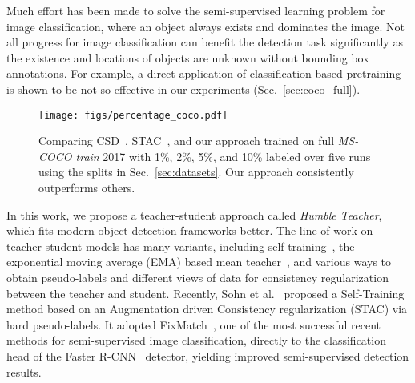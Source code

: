 \documentclass[final]{cvpr}
\begin{document}
Much effort has been made to solve the semi-supervised learning problem for image classification, where an object always exists and dominates the image. 
Not all progress for image classification can benefit the detection task significantly as the existence and locations of objects are unknown without bounding box annotations. 
For example, a direct application of classification-based pretraining~\cite{He_2020_moco,chen2020improved} is shown to be not so effective in our experiments (Sec.~\ref{sec:coco_full}).

\begin{figure}[tp!]
  \centering
  \vspace*{0.2em}
  \texttt{[image: figs/percentage\_coco.pdf]}
  \caption{Comparing CSD~\cite{jeong2019consistency}, STAC~\cite{sohn2020simple}, and our approach trained on full \textit{MS-COCO train} 2017 with 1\%, 2\%, 5\%, and 10\% labeled over five runs using the splits in Sec.~\ref{sec:datasets}. Our approach consistently outperforms others.}\label{fig:percentage_COCO}
\end{figure}

In this work, we propose a teacher-student approach called \emph{Humble
Teacher}, which fits modern object detection frameworks better.
The line of work on teacher-student models has many variants, including
self-training~\cite{scudder1965probability,yarowsky1995unsupervised,riloff1996automatically,sohn2020fixmatch,Xie_2020_noisy_student},
the exponential moving average (EMA) based mean teacher~\cite{tarvainen2017mean},
and various ways to obtain pseudo-labels and different views of data
for consistency regularization \cite{zhai2019s4l,laine2016temporal,sajjadi2016regularization,sohn2020fixmatch}
between the teacher and student. Recently, Sohn et al.~\cite{sohn2020simple}
proposed a Self-Training method based on an Augmentation driven Consistency
regularization (STAC) via hard pseudo-labels. It adopted FixMatch~\cite{sohn2020fixmatch},
one of the most successful recent methods for semi-supervised image
classification, directly to the classification head of the Faster
R-CNN~\cite{ren2015faster} detector, yielding improved semi-supervised
detection results. 
\end{document}
